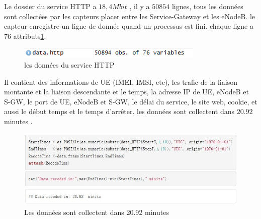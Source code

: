 Le dossier du service HTTP a $18,4Mbit$ , il y a $50854$ lignes, tous les données sont collectées par les capteurs placer entre les Service-Gateway et les eNodeB. le capteur enregistre un ligne de donnée quand un processus est fini. chaque ligne a $76$ attributs\ref{Fig.HTTP}.

      \begin{figure}[H]
          \centering
          \includegraphics[width=3.5in]{images/http.png}
          \caption{les données du service HTTP}
          \label{Fig.HTTP}
      \end{figure}
      
Il contient des informations de UE (IMEI, IMSI, etc), les trafic de la liaison montante et la liaison descendante et le temps, la adresse IP de UE, eNodeB et S-GW, le port de UE, eNodeB et S-GW, le délai du service, le site web, cookie, et aussi le début temps et le temps d'arrêter.
les données sont collectent dans $20.92$ minutes .

      
      \begin{figure}[H]
\centering
\includegraphics[width=15Cm]{images/lasttime}
\caption{Les données sont collectent dans 20.92 minutes}
\label{fig:lasttime}
\end{figure}

